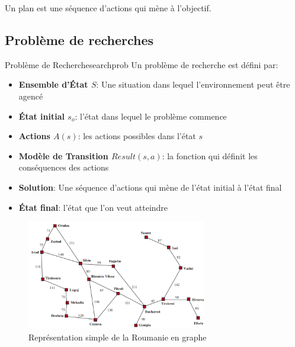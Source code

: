 \documentclass[a4paper, 12pt]{extarticle}
\begin{document}
\begin{note}
    Un plan est une séquence d'actions qui mène à l'objectif.
\end{note}

\subsection{Problème de recherches} %
\label{sub:probleme_de_recherches}

\begin{definition}{Problème de Recherche}{searchprob}
    Un problème de recherche est défini par:
    \begin{itemize}
        \item \textbf{Ensemble d'État $S$}: Une situation dans lequel l'environnement peut être agencé
        \item \textbf{État initial $s_o$}: l'état dans lequel le problème commence
        \item \textbf{Actions $A(s)$}: les actions possibles dans l'état $s$
        \item \textbf{Modèle de Transition $Result(s, a)$}: la fonction qui définit les conséquences des actions
        \item \textbf{Solution}: Une séquence d'actions qui mène de l'état initial à l'état final
        \item \textbf{État final}: l'état que l'on veut atteindre
    \end{itemize}
\end{definition}


\begin{figure}[H]
    \begin{center}
        \includegraphics[width=0.70\textwidth]{./pictures/roumanie.png}
    \end{center}
    \caption{Représentation simple de la Roumanie en graphe}\label{fig:romania}
\end{figure}
\end{document}
